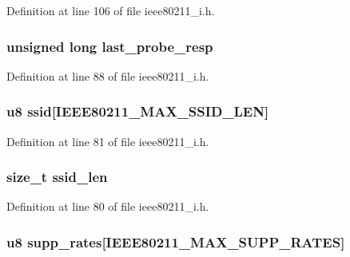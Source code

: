 Definition at line 106 of file ieee80211\-\_\-i.\-h.

\hypertarget{structieee80211__bss_ac009e6154e131af1edf18c445ebb4393}{
\subsubsection[{last\-\_\-probe\-\_\-resp}]{\setlength{\rightskip}{0pt plus 5cm}unsigned long last\-\_\-probe\-\_\-resp}}\label{structieee80211__bss_ac009e6154e131af1edf18c445ebb4393}


Definition at line 88 of file ieee80211\-\_\-i.\-h.

\hypertarget{structieee80211__bss_ae8d768cff77168f424870b6745c90714}{
\subsubsection[{ssid}]{\setlength{\rightskip}{0pt plus 5cm}u8 ssid\mbox{[}I\-E\-E\-E80211\-\_\-\-M\-A\-X\-\_\-\-S\-S\-I\-D\-\_\-\-L\-E\-N\mbox{]}}}\label{structieee80211__bss_ae8d768cff77168f424870b6745c90714}


Definition at line 81 of file ieee80211\-\_\-i.\-h.

\hypertarget{structieee80211__bss_aa33b1cb67d6867fb505f832d761810a7}{
\subsubsection[{ssid\-\_\-len}]{\setlength{\rightskip}{0pt plus 5cm}size\-\_\-t ssid\-\_\-len}}\label{structieee80211__bss_aa33b1cb67d6867fb505f832d761810a7}


Definition at line 80 of file ieee80211\-\_\-i.\-h.

\hypertarget{structieee80211__bss_a84e8f110c38462141993f5eccc9a2e70}{
\subsubsection[{supp\-\_\-rates}]{\setlength{\rightskip}{0pt plus 5cm}u8 supp\-\_\-rates\mbox{[}{\bf I\-E\-E\-E80211\-\_\-\-M\-A\-X\-\_\-\-S\-U\-P\-P\-\_\-\-R\-A\-T\-E\-S}\mbox{]}}}\label{structieee80211__bss_a84e8f110c38462141993f5eccc9a2e70}


